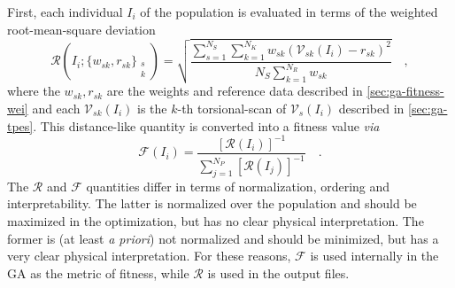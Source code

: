 \documentclass[10pt,a4paper,openany]{memoir}
\numberwithin{equation}{section}
\begin{document}
First, each individual $I_i$ of the population is evaluated in terms of the weighted root-mean-square deviation
\begin{equation}
  \label{eq:ga-fitness-rmsd}
  \mathcal{R}\left(I_i;\{w_{sk},r_{sk}\}_{\substack{s\\k}} \right) = \sqrt{\frac{\sum_{s=1}^{N_S} \sum_{k=1}^{N_K} w_{sk}(\mathcal{V}_{sk}(I_i)-r_{sk})^2}{N_S \sum_{k=1}^{N_R} w_{sk}}} \quad ,
\end{equation}
where the $w_{sk},r_{sk}$ are the weights and reference data described in \autoref{sec:ga-fitness-wei}
and each $\mathcal{V}_{sk}(I_i)$ is the $k$-th torsional-scan of $\mathcal{V}_s(I_i)$ described in \autoref{sec:ga-tpes}.
This distance-like quantity is converted into a fitness value \textit{via}
\begin{equation}
  \label{eq:ga-fitness}
  \mathcal{F}(I_i) =\frac{\left[\mathcal{R}(I_i)\right]^{-1}}{\sum_{j=1}^{N_P} \left[\mathcal{R}(I_j)\right]^{-1}} \quad .
\end{equation}
The $\mathcal{R}$ and $\mathcal{F}$ quantities differ in terms of normalization, ordering and interpretability.
The latter is normalized over the population and should be maximized in the optimization, but has no clear physical interpretation.
The former is (at least \textit{a priori}) not normalized and should be minimized, but has a very clear physical interpretation.
For these reasons, $\mathcal{F}$ is used internally in the GA as the metric of fitness, while $\mathcal{R}$ is used in the output files.

\end{document}
